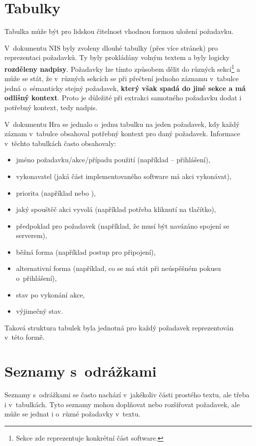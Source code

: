 \documentclass[czech, bc, kiv, he, iso690numb, pdf]{fasthesis}
\begin{document}
\section{Tabulky}
Tabulka může být pro lidskou čitelnost vhodnou formou uložení požadavku.

V~dokumentu NIS byly zvoleny dlouhé tabulky (přes více stránek) pro reprezentaci požadavků. Ty byly prokládány volným textem a byly logicky \textbf{rozděleny nadpisy}. Požadavky lze tímto způsobem dělit do různých sekcí\footnote{Sekce zde reprezentuje konkrétní část software.} a může se stát, že v~různých sekcích se při přečtení jednoho záznamu v~tabulce jedná o~sémanticky stejný požadavek, \textbf{který však spadá do jiné sekce a má odlišný kontext}. Proto je důležité při extrakci samotného požadavku dodat i potřebný kontext, tedy nadpis.

V~dokumentu Hra se jednalo o~jednu tabulku na jeden požadavek, kdy každý záznam v~tabulce obsahoval potřebný kontext pro daný požadavek. Informace v~těchto tabulkách často obsahovaly:
\begin{itemize}
    \item jméno požadavku/akce/případu použití (například  -- přihlášení),
    \item vykonavatel (jaká část implementovaného software má akci vykonávat),
    \item priorita (například  nebo ),
    \item jaký spouštěč akci vyvolá (například potřeba kliknutí na tlačítko),
    \item předpoklad pro požadavek (například, že musí být navázáno spojení se serverem),
    \item běžná forma (například postup pro připojení),
    \item alternativní forma (například, co se má stát při neúspěšném pokusu o~přihlášení),
    \item stav po vykonání akce,
    \item výjimečný stav.
\end{itemize}

Taková struktura tabulek byla jednotná pro každý požadavek reprezentován v~této formě.

\section{Seznamy s~odrážkami}
Seznamy s~odrážkami se často nachází v~jakékoliv části prostého textu, ale třeba i v~tabulkách. Tyto seznamy mohou doplňovat nebo rozšiřovat požadavek, ale může se jednat i o~různé požadavky v~textu.
\end{document}
